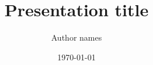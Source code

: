 \documentclass[aspectratio=169]{beamer}
\author{Author names}
\title{Presentation title}
\date{\today}
\begin{document}
\begin{frame}
\titlepage
\end{frame}


\end{document}
